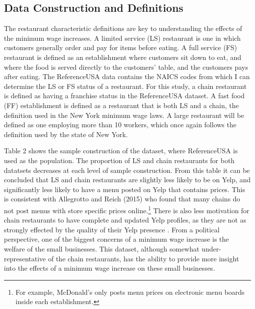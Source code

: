\documentclass[11pt]{article}
\begin{document}
\subsection{Data Construction and  Definitions}

The restaurant characteristic definitions are key to understanding the effects of the minimum wage increases. A limited service (LS) restaurant is one in which customers generally order and pay for items before eating. A full service (FS) restaurant is defined as an establishment where customers sit down to eat, and where the food is served directly to the customers' table, and the customers pays after eating. The ReferenceUSA data contains the NAICS codes from which I can determine the LS or FS status of a restaurant. For this study, a chain restaurant is defined as having a franchise status in the ReferenceUSA dataset. A fast food (FF) establishment is defined as a restaurant that is both LS and a chain, the definition used in the New York minimum wage laws. A large restaurant will be defined as one employing more than 10 workers, which once again follows the definition used by the state of New York.

Table 2 shows the sample construction of the dataset, where ReferenceUSA is used as the population. The proportion of LS and chain restaurants for both datatsets decreases at each level of sample construction. From this table it can be concluded that LS and chain restaurants are slightly less likely to be on Yelp, and significantly less likely to have a menu posted on Yelp that contains prices. This is consistent with Allegrotto and Reich (2015) who found that many chains do not post menus with store specific prices online.\nocite{allegretto2016local}\footnote{For example, McDonald's only posts menu prices on electronic menu boards inside each establishment.} There is also less motivation for chain restaurants to have complete and updated Yelp profiles, as they are not as strongly effected by the quality of their Yelp presence \cite{luca2011reviews}. From a political perspective, one of the biggest concerns of a minimum wage increase is the welfare of the small businesses. This dataset, although somewhat under-representative of the chain restaurants, has the ability to provide more insight into the effects of a minimum wage increase on these small businesses. %
\end{document}
